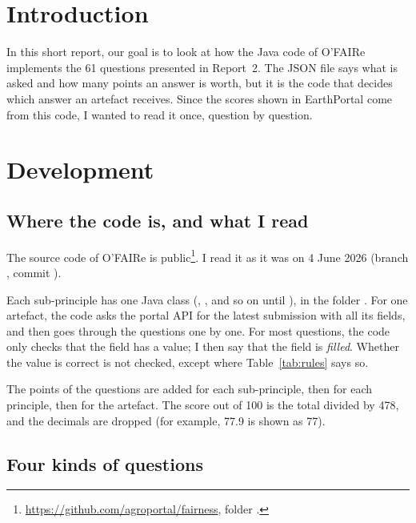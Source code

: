 \documentclass[11pt,a4paper]{article}
\begin{document}
\makereporttitlepage

\section{Introduction}

In this short report, our goal is to look at how the Java code of O'FAIRe implements the 61
questions presented in Report~2. The JSON file says what is asked and how many points an answer
is worth, but it is the code that decides which answer an artefact receives. Since the scores
shown in EarthPortal come from this code, I wanted to read it once, question by question.

\section{Development}

\subsection{Where the code is, and what I read}

The source code of O'FAIRe is public\footnote{\url{https://github.com/agroportal/fairness}, folder
.}. I read it as it was on 4 June 2026 (branch
, commit ). 

Each sub-principle has one Java class (, , and so on until
), in the folder . For one artefact, the code asks
the portal API for the latest submission with all its fields, and then goes through the questions
one by one. For most questions, the code only checks that the field has a value; I then say
that the field is \emph{filled}. Whether the value is correct is not checked, except where
Table~\ref{tab:rules} says so.

The points of the questions are added for each sub-principle, then for each principle, then for the
artefact. The score out of 100 is the total divided by 478, and the decimals are dropped (for
example, 77.9 is shown as 77).

\subsection{Four kinds of questions}
\end{document}
